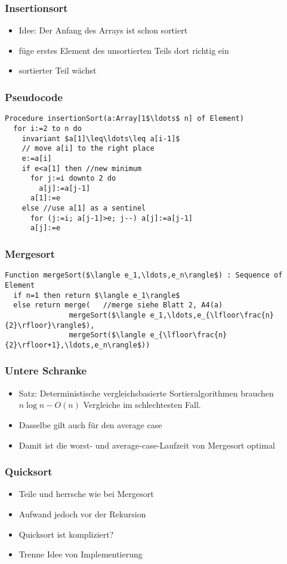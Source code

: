 \begin{frame}
\frametitle{Insertionsort}
\begin{itemize}
\item Idee: Der Anfang des Arrays ist schon sortiert
\item füge erstes Element des unsortierten Teils dort richtig ein
\item sortierter Teil wächst
\end{itemize}
\end{frame}

\begin{frame}[fragile]
\frametitle{Pseudocode}
\begin{lstlisting}
Procedure insertionSort(a:Array[1$\ldots$ n] of Element)
  for i:=2 to n do
    invariant $a[1]\leq\ldots\leq a[i-1]$
    // move a[i] to the right place
    e:=a[i]
    if e<a[1] then //new minimum
      for j:=i downto 2 do
        a[j]:=a[j-1]
      a[1]:=e
    else //use a[1] as a sentinel
      for (j:=i; a[j-1]>e; j--) a[j]:=a[j-1]
      a[j]:=e
\end{lstlisting}
\end{frame}

\begin{frame}[fragile]
\frametitle{Mergesort}
\begin{lstlisting}
Function mergeSort($\langle e_1,\ldots,e_n\rangle$) : Sequence of Element
  if n=1 then return $\langle e_1\rangle$
  else return merge(   //merge siehe Blatt 2, A4(a)
               mergeSort($\langle e_1,\ldots,e_{\lfloor\frac{n}{2}\rfloor}\rangle$),
               mergeSort($\langle e_{\lfloor\frac{n}{2}\rfloor+1},\ldots,e_n\rangle$))
\end{lstlisting}
\end{frame}

\begin{frame}
\frametitle{Untere Schranke}
\begin{itemize}
\item Satz: Deterministische vergleichsbasierte Sortieralgorithmen brauchen $n\log n-O(n)$ Vergleiche im schlechtesten Fall.\pause
\item Dasselbe gilt auch für den average case\pause
\item Damit ist die worst- und average-case-Laufzeit von Mergesort optimal
\end{itemize}
\end{frame}

\begin{frame}
\frametitle{Quicksort}
\begin{itemize}
\item Teile und herrsche wie bei Mergesort
\item Aufwand jedoch vor der Rekursion\pause
\item Quicksort ist kompliziert?\pause
\item Trenne Idee von Implementierung
\end{itemize}
\end{frame}

